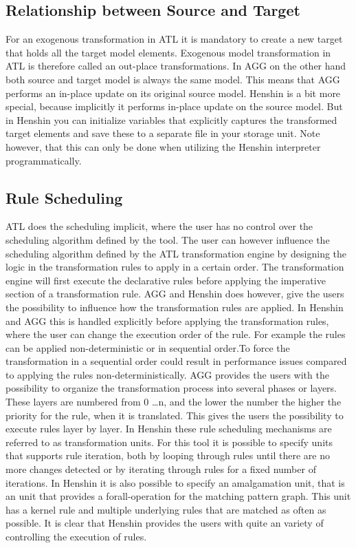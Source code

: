 \subsection{Relationship between Source and Target}
For an exogenous transformation in ATL it is mandatory to create a new target
that holds all the target model elements. Exogenous model transformation in ATL
is therefore called an out-place transformations. In AGG on the other hand both
source and target model is always the same model. This means that AGG performs an
in-place update on its original source model. Henshin is a bit more special,
because implicitly it performs in-place update on the source model. But in
Henshin you can initialize variables that explicitly captures the transformed
target elements and save these to a separate file in your storage unit. Note
however, that this can only be done when utilizing the Henshin interpreter
programmatically. 

\subsection{Rule Scheduling}

ATL does the scheduling implicit, where the user has no control over the
scheduling algorithm defined by the tool. The user can however influence the scheduling
algorithm defined by the ATL transformation engine by designing the logic in the
transformation rules to apply in a certain order. The transformation
engine will first execute the declarative rules before applying the imperative
section of a transformation rule. AGG and Henshin does however, give the
users the possibility to influence how the transformation rules are applied. 
In Henshin and AGG this is handled explicitly before applying the transformation
rules, where the user can change the execution order of the rule.
For example the rules can be applied non-deterministic or in sequential order.To
force the transformation in a sequential order could result in performance
issues compared to applying the rules non-deterministically. AGG provides the
users with the possibility to organize the transformation process into several
phases or layers. These layers are numbered from 0 \ldots n, and the lower the
number the higher the priority for the rule, when it is translated. This gives
the users the possibility to execute rules layer by layer. In Henshin these
rule scheduling mechanisms are referred to as transformation units. For this
tool it is possible to specify units that supports rule iteration, both by
looping through rules until there are no more changes detected or by iterating
through rules for a fixed number of iterations. In Henshin it is also possible
to specify an amalgamation unit, that is an unit that provides a
forall-operation for the matching pattern graph. This unit has a kernel rule
and multiple underlying rules that are matched as often as possible. It is
clear that Henshin provides the users with quite an variety of controlling the
execution of rules.

